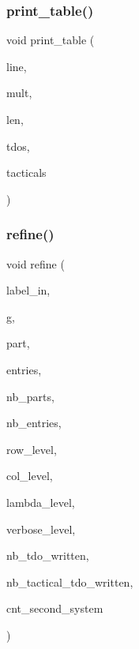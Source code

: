 \mbox{\label{tdo__refine__all_8_c_a7d70eff8b2fce8dc35630b6334f03f59}} 
\subsubsection{\texorpdfstring{print\+\_\+table()}{print\_table()}}
{\footnotesize\ttfamily void print\+\_\+table (\begin{DoxyParamCaption}\item[{int $\ast$}]{line,  }\item[{int $\ast$}]{mult,  }\item[{int}]{len,  }\item[{int}]{tdos,  }\item[{int}]{tacticals }\end{DoxyParamCaption})}

\mbox{\label{tdo__refine__all_8_c_a69603cf79885d852e0a2b12223f10462}} 
\subsubsection{\texorpdfstring{refine()}{refine()}}
{\footnotesize\ttfamily void refine (\begin{DoxyParamCaption}\item[{\mbox{\hyperlink{galois_8h_ab6cc7b4aeb6ea31aba2b3fbfc83ff5e6}{B\+Y\+TE}} $\ast$}]{label\+\_\+in,  }\item[{ofstream \&}]{g,  }\item[{int $\ast$}]{part,  }\item[{int $\ast$}]{entries,  }\item[{int}]{nb\+\_\+parts,  }\item[{int}]{nb\+\_\+entries,  }\item[{int}]{row\+\_\+level,  }\item[{int}]{col\+\_\+level,  }\item[{int}]{lambda\+\_\+level,  }\item[{int}]{verbose\+\_\+level,  }\item[{int \&}]{nb\+\_\+tdo\+\_\+written,  }\item[{int \&}]{nb\+\_\+tactical\+\_\+tdo\+\_\+written,  }\item[{\mbox{\hyperlink{galois_8h_a09fddde158a3a20bd2dcadb609de11dc}{I\+NT}} \&}]{cnt\+\_\+second\+\_\+system }\end{DoxyParamCaption})}

